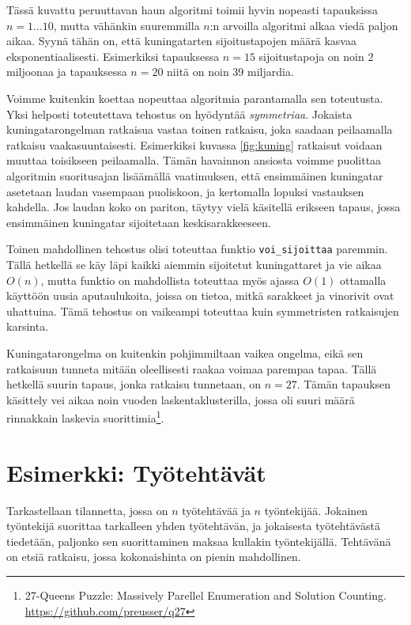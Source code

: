 Tässä kuvattu peruuttavan haun algoritmi toimii hyvin nopeasti
tapauksissa $n=1 \dots 10$,
mutta vähänkin suuremmilla $n$:n arvoilla
algoritmi alkaa viedä paljon aikaa.
Syynä tähän on, että kuningatarten sijoitustapojen
määrä kasvaa eksponentiaalisesti.
Esimerkiksi tapauksessa $n=15$ sijoitustapoja on
noin 2 miljoonaa ja tapauksessa $n=20$ niitä on noin 39 miljardia.

Voimme kuitenkin koettaa nopeuttaa algoritmia parantamalla
sen toteutusta.
Yksi helposti toteutettava tehostus on hyödyntää \emph{symmetriaa}.
Jokaista kuningatarongelman ratkaisua vastaa toinen ratkaisu,
joka saadaan peilaamalla ratkaisu vaakasuuntaisesti.
Esimerkiksi kuvassa \ref{fig:kuning} ratkaisut voidaan muuttaa
toisikseen peilaamalla.
Tämän havainnon ansiosta voimme puolittaa algoritmin suoritusajan
lisäämällä vaatimuksen, että ensimmäinen kuningatar asetetaan
laudan vasempaan puoliskoon, ja kertomalla lopuksi vastauksen kahdella.
Jos laudan koko on pariton, täytyy vielä käsitellä erikseen tapaus,
jossa ensimmäinen kuningatar sijoitetaan keskisarakkeeseen.

Toinen mahdollinen tehostus olisi toteuttaa funktio
\texttt{voi\_sijoittaa} paremmin.
Tällä hetkellä se käy läpi kaikki aiemmin sijoitetut kuningattaret
ja vie aikaa $O(n)$, mutta funktio on mahdollista toteuttaa myös
ajassa $O(1)$ ottamalla käyttöön uusia aputaulukoita, joissa on tietoa,
mitkä sarakkeet ja vinorivit ovat uhattuina.
Tämä tehostus on vaikeampi toteuttaa kuin symmetristen ratkaisujen karsinta.

Kuningatarongelma on kuitenkin pohjimmiltaan vaikea ongelma,
eikä sen ratkaisuun tunneta mitään oleellisesti raakaa voimaa
parempaa tapaa.
Tällä hetkellä suurin tapaus, jonka ratkaisu tunnetaan, on $n=27$.
Tämän tapauksen käsittely vei aikaa noin vuoden laskentaklusterilla,
jossa oli suuri määrä rinnakkain laskevia
suorittimia\footnote{27-Queens Puzzle: Massively Parellel Enumeration and Solution Counting.
\url{https://github.com/preusser/q27}}.

\section{Esimerkki: Työtehtävät}

Tarkastellaan tilannetta, jossa on $n$ työtehtävää ja
$n$ työntekijää.
Jokainen työntekijä suorittaa tarkalleen yhden työtehtävän,
ja jokaisesta työtehtävästä tiedetään,
paljonko sen suorittaminen maksaa kullakin työntekijällä.
Tehtä\-vänä on etsiä ratkaisu, jossa kokonaishinta on pienin mahdollinen.

